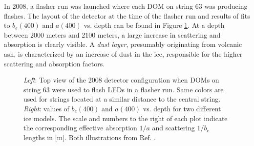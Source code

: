 In 2008, a flasher run was launched where each DOM on string 63 was producing flashes. The layout of the detector at the time of the flasher run and results of fits to $b_{e}(400)$ and $a(400)$ vs. depth can be found in Figure \ref{fig:2008config}. At a depth between 2000 meters and 2100 meters, a large increase in scattering and absorption is clearly visible. A \textit{dust layer}, presumably originating from volcanic ash, is characterized by an increase of dust in the ice, responsible for the higher scattering and absorption factors.

\begin{figure}[t]
\begin{minipage}{6in}
  \centering
  \hspace*{.7in}
\end{minipage}
\caption{\textit{Left}: Top view of the 2008 detector configuration when DOMs on string 63 were used to flash LEDs in a flasher run. Same colors are used for strings located at a similar distance to the central string. \textit{Right}: values of $b_{e}(400)$ and $a(400)$ vs. depth for two different ice models. The scale and numbers to the right of each plot indicate the corresponding effective  absorption $1/a$ and scattering $1/b_e$ lengths in [m]. Both illustrations from Ref. \cite{1412998}.}
%
\label{fig:2008config}
\end{figure}

